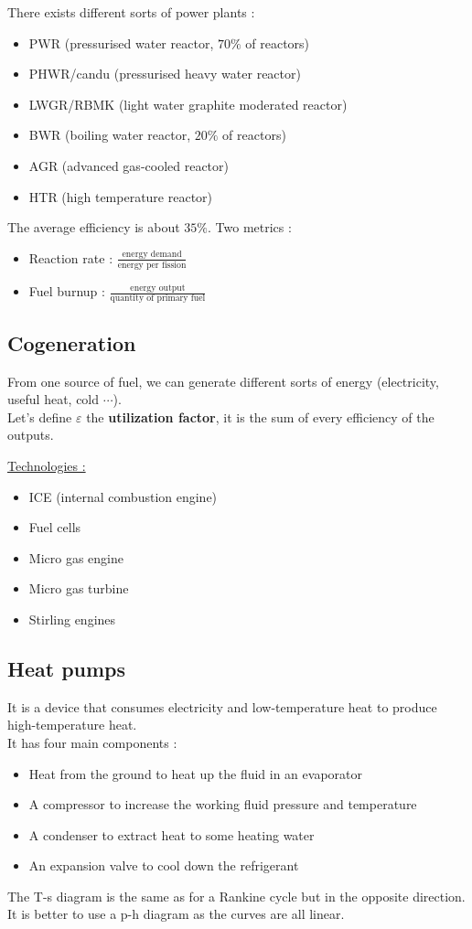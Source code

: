 \documentclass[../main.tex]{subfiles}
\begin{document}
There exists different sorts of power plants : \begin{itemize}
    \item PWR (pressurised water reactor, $70\%$ of reactors)
    \item PHWR/candu (pressurised heavy water reactor)
    \item LWGR/RBMK (light water graphite moderated reactor)
    \item BWR (boiling water reactor, $20\%$ of reactors)
    \item AGR (advanced gas-cooled reactor)
    \item HTR (high temperature reactor)
\end{itemize}

The average efficiency is about $35\%$.
Two metrics : \begin{itemize}
    \item Reaction rate : $\frac{\text{energy demand}}{\text{energy per fission}}$
    \item Fuel burnup : $\frac{\text{energy output}}{\text{quantity of primary fuel}}$
\end{itemize}

\subsection{Cogeneration}
From one source of fuel, we can generate different sorts of energy (electricity, useful heat, cold $\cdots$).\\
Let's define $\varepsilon$ the \textbf{utilization factor}, it is the sum of every efficiency of the outputs.

\quad \underline{Technologies :}\\
\begin{itemize}
    \item ICE (internal combustion engine)
    \item Fuel cells
    \item Micro gas engine
    \item Micro gas turbine
    \item Stirling engines
\end{itemize}

\subsection{Heat pumps}

It is a device that consumes electricity and low-temperature heat to produce high-temperature heat.\\
It has four main components : \begin{itemize}
    \item Heat from the ground to heat up the fluid in an evaporator
    \item A compressor to increase the working fluid pressure and temperature
    \item A condenser to extract heat to some heating water
    \item An expansion valve to cool down the refrigerant
\end{itemize}
The T-s diagram is the same as for a Rankine cycle but in the opposite direction. It is better to use a p-h diagram as the curves are all linear.
\end{document}
